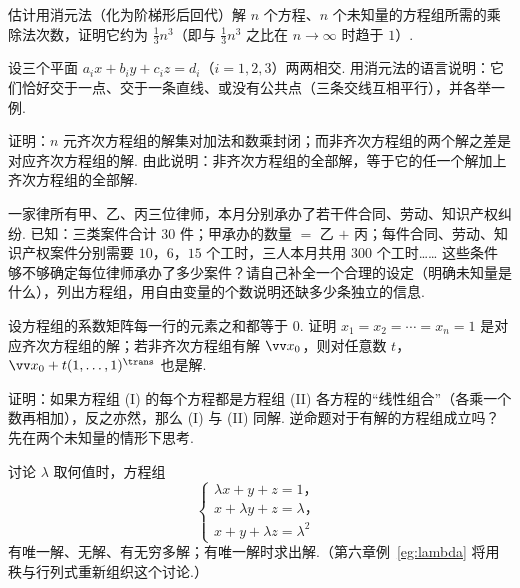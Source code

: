 {\begin{exB}
			\item\label{ex:elim:B10} 估计用消元法（化为阶梯形后回代）解 $n$ 个方程、$n$ 个未知量的方程组所需的乘除法次数，证明它约为 $\frac13n^3$（即与 $\frac13n^3$ 之比在 $n\to\infty$ 时趋于 $1$）.
			\item\label{ex:elim:B11} 设三个平面 $a_ix+b_iy+c_iz=d_i$（$i=1,2,3$）两两相交. 用消元法的语言说明：它们恰好交于一点、交于一条直线、或没有公共点（三条交线互相平行），并各举一例.
			\item\label{ex:elim:B12} 证明：$n$ 元齐次方程组的解集对加法和数乘封闭；而非齐次方程组的两个解之差是对应齐次方程组的解. 由此说明：非齐次方程组的全部解，等于它的任一个解加上齐次方程组的全部解.
			\item\label{ex:elim:B13} 一家律所有甲、乙、丙三位律师，本月分别承办了若干件合同、劳动、知识产权纠纷. 已知：三类案件合计 $30$ 件；甲承办的数量 $=$ 乙 $+$ 丙；每件合同、劳动、知识产权案件分别需要 $10$，$6$，$15$ 个工时，三人本月共用 $300$ 个工时……
			这些条件够不够确定每位律师承办了多少案件？请自己补全一个合理的设定（明确未知量是什么），列出方程组，用自由变量的个数说明还缺多少条独立的信息.
			\item\label{ex:elim:B14} 设方程组的系数矩阵每一行的元素之和都等于 $0$. 证明 $x_1=x_2=\cdots=x_n=1$ 是对应齐次方程组的解；若非齐次方程组有解 $\vv x_0$，则对任意数 $t$，$\vv x_0+t(1,\ldots,1)^\trans$ 也是解.
			\item\label{ex:elim:B15} 证明：如果方程组 (I) 的每个方程都是方程组 (II) 各方程的“线性组合”（各乘一个数再相加），反之亦然，那么 (I) 与 (II) 同解. 逆命题对于有解的方程组成立吗？先在两个未知量的情形下思考.
			\item\label{ex:elim:B16} 讨论 $\lambda$ 取何值时，方程组 $$\left \{ \begin{array}{l}\lambda x+y+z=1，\\ x+\lambda y+z=\lambda，\\ x+y+\lambda z=\lambda^2\end{array}\right.$$ 有唯一解、无解、有无穷多解；有唯一解时求出解.（第六章例~\ref{eg:lambda} 将用秩与行列式重新组织这个讨论.）
		\end{exB}
		
}
